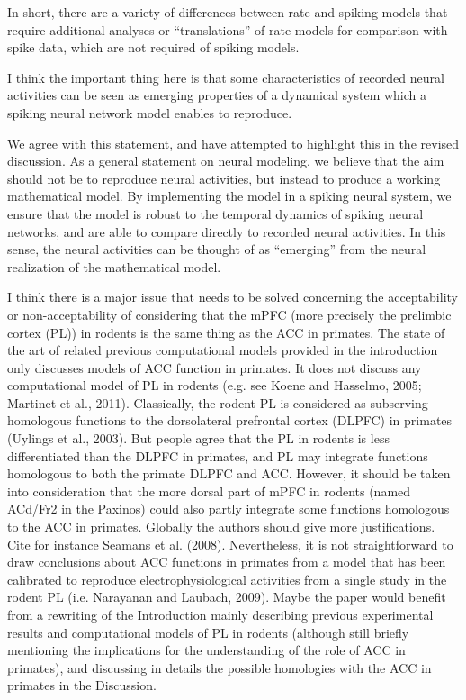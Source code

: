 \documentclass[11pt,paper=letter]{scrartcl}
\begin{document}
In short, there are a variety
of differences between rate and spiking models
that require additional analyses
or ``translations'' of rate models
for comparison with spike data,
which are not required of spiking models.

\begin{quoting}
  I think the important thing here is that some characteristics of
  recorded neural activities can be seen as emerging properties of a
  dynamical system which a spiking neural network model enables to
  reproduce.
\end{quoting}

We agree with this statement,
and have attempted to highlight this
in the revised discussion.
As a general statement on neural modeling,
we believe that the aim should not be
to reproduce neural activities,
but instead to produce a working mathematical model.
By implementing the model in a spiking neural system,
we ensure that the model is robust
to the temporal dynamics of spiking neural networks,
and are able to compare directly
to recorded neural activities.
In this sense, the neural activities can be thought of
as ``emerging'' from the neural realization
of the mathematical model.

\begin{quoting}
  I think there is a major issue that needs to be solved concerning
  the acceptability or non-acceptability of considering that the mPFC
  (more precisely the prelimbic cortex (PL)) in rodents is the same
  thing as the ACC in primates. The state of the art of related
  previous computational models provided in the introduction only
  discusses models of ACC function in primates. It does not discuss
  any computational model of PL in rodents (e.g. see Koene and
  Hasselmo, 2005; Martinet et al., 2011). Classically, the rodent PL
  is considered as subserving homologous functions to the dorsolateral
  prefrontal cortex (DLPFC) in primates (Uylings et al., 2003). But
  people agree that the PL in rodents is less differentiated than the
  DLPFC in primates, and PL may integrate functions homologous to both
  the primate DLPFC and ACC. However, it should be taken into
  consideration that the more dorsal part of mPFC in rodents (named
  ACd/Fr2 in the Paxinos) could also partly integrate some functions
  homologous to the ACC in primates. Globally the authors should give
  more justifications. Cite for instance Seamans et al. (2008).
  Nevertheless, it is not straightforward to draw conclusions about
  ACC functions in primates from a model that has been calibrated to
  reproduce electrophysiological activities from a single study in the
  rodent PL (i.e. Narayanan and Laubach, 2009). Maybe the paper would
  benefit from a rewriting of the Introduction mainly describing
  previous experimental results and computational models of PL in
  rodents (although still briefly mentioning the implications for the
  understanding of the role of ACC in primates), and discussing in
  details the possible homologies with the ACC in primates in the
  Discussion.
\end{quoting}
\end{document}
